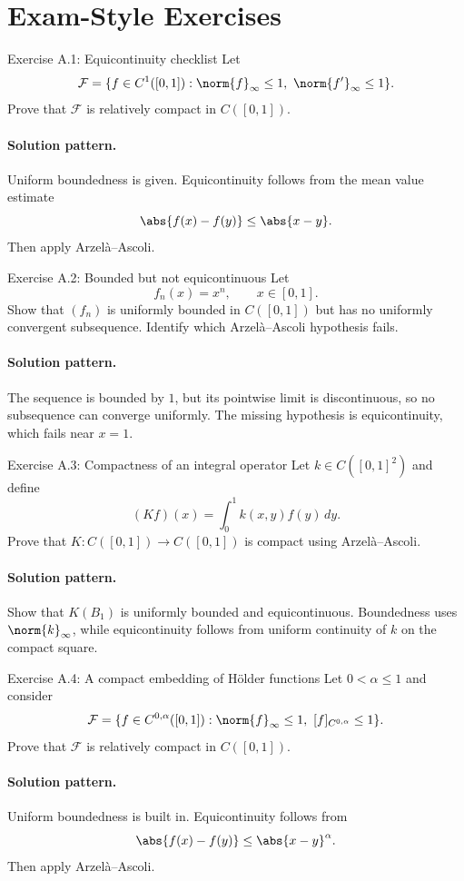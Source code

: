 \documentclass[header={Appendix A Exam Study Notes}]{study-note}
\begin{document}
\section{Exam-Style Exercises}

\begin{exbox}{Exercise A.1: Equicontinuity checklist}
Let
\[
\mathcal F=\{f\in C^1([0,1]): \norm{f}_{\infty}\le 1,\ \norm{f'}_{\infty}\le 1\}.
\]
Prove that $\mathcal F$ is relatively compact in $C([0,1])$.

\paragraph{Solution pattern.}
Uniform boundedness is given. Equicontinuity follows from the mean value estimate
\[
\abs{f(x)-f(y)}\le \abs{x-y}.
\]
Then apply Arzel\`a--Ascoli.
\end{exbox}

\begin{exbox}{Exercise A.2: Bounded but not equicontinuous}
Let
\[
f_n(x)=x^n, \qquad x\in[0,1].
\]
Show that $(f_n)$ is uniformly bounded in $C([0,1])$ but has no uniformly convergent subsequence. Identify which Arzel\`a--Ascoli hypothesis fails.

\paragraph{Solution pattern.}
The sequence is bounded by $1$, but its pointwise limit is discontinuous, so no subsequence can converge uniformly. The missing hypothesis is equicontinuity, which fails near $x=1$.
\end{exbox}

\begin{exbox}{Exercise A.3: Compactness of an integral operator}
Let $k\in C([0,1]^2)$ and define
\[
(Kf)(x)=\int_0^1 k(x,y)f(y)\,dy.
\]
Prove that $K:C([0,1])\to C([0,1])$ is compact using Arzel\`a--Ascoli.

\paragraph{Solution pattern.}
Show that $K(B_1)$ is uniformly bounded and equicontinuous. Boundedness uses $\norm{k}_{\infty}$, while equicontinuity follows from uniform continuity of $k$ on the compact square.
\end{exbox}

\begin{exbox}{Exercise A.4: A compact embedding of H\"older functions}
Let $0<\alpha\le 1$ and consider
\[
\mathcal F=\{f\in C^{0,\alpha}([0,1]): \norm{f}_{\infty}\le 1,\ [f]_{C^{0,\alpha}}\le 1\}.
\]
Prove that $\mathcal F$ is relatively compact in $C([0,1])$.

\paragraph{Solution pattern.}
Uniform boundedness is built in. Equicontinuity follows from
\[
\abs{f(x)-f(y)}\le \abs{x-y}^{\alpha}.
\]
Then apply Arzel\`a--Ascoli.
\end{exbox}
\end{document}
